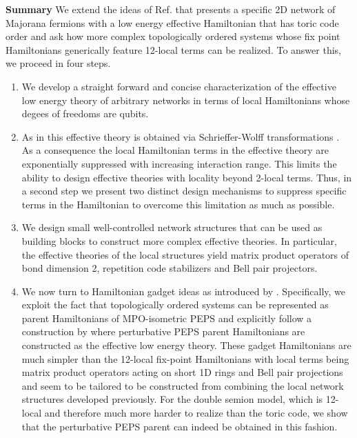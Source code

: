 \documentclass[
onecolumn,
superscriptaddress,
amsmath,
amssymb,
notitlepage,
11pt,
tightenlines,
hyperref
]{revtex4-1}
\newcommand{\+}{\mkern2mu}
\DeclareMathOperator{\1}{\mathds{1}}
\begin{document}
\textbf{Summary}
We extend the ideas of Ref. \cite{Terhal} that presents a specific 2D network of Majorana fermions with a low energy effective Hamiltonian that has toric code order and ask how more complex topologically ordered systems whose fix point Hamiltonians generically feature 12-local terms can be realized. To answer this, we proceed in four steps. \begin{enumerate}
\item We develop a straight forward and concise characterization of the effective low energy theory of arbitrary networks in terms of local Hamiltonians whose degees of freedoms are qubits.
\item As in \cite{Terhal} this effective theory is obtained via Schrieffer-Wolff transformations \cite{BRAVYI20112793}. As a consequence the local Hamiltonian terms in the effective theory are exponentially suppressed with increasing interaction range. This limits the ability to design effective theories with locality beyond 2-local terms. 
Thus, in a second step we present two distinct design mechanisms to suppress specific terms in the Hamiltonian to overcome this limitation as much as possible. 
\item We design small well-controlled network structures that can be used as building blocks to construct more complex effective theories. In particular, the effective theories of the local structures yield matrix product operators of bond dimension 2, repetition code stabilizers and Bell pair projectors. 
\item We now turn to Hamiltonian gadget ideas as introduced by \cite{Kempe-SIAM-2006}.
Specifically, we exploit the fact that topologically ordered systems can be represented as parent Hamiltonians of MPO-isometric PEPS \cite{Bultinck2017} and explicitly follow a construction by \cite{Brell2014PEPS} where perturbative PEPS parent Hamiltonians are constructed as the effective low energy theory. These gadget Hamiltonians are much simpler than the 12-local fix-point Hamiltonians with local terms being matrix product operators acting on short 1D rings and Bell pair projections and seem to be tailored to be constructed from combining the local network structures developed previously. For the double semion model, which is 12-local and therefore much more harder to realize than the toric code, we show that the perturbative PEPS parent can indeed be obtained in this fashion.
\end{enumerate}  



\end{document}
